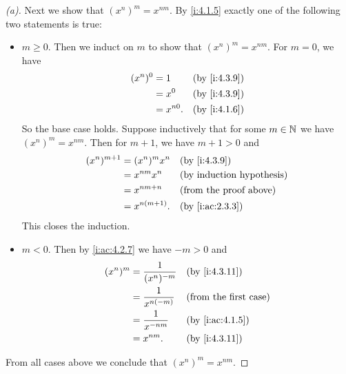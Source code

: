 \begin{proof}[(a)]
  Next we show that \((x^n)^m = x^{nm}\).
  By \cref{i:4.1.5} exactly one of the following two statements is true:
  \begin{itemize}
    \item \(m \geq 0\).
          Then we induct on \(m\) to show that \((x^n)^m = x^{nm}\).
          For \(m = 0\), we have
          \begin{align*}
            (x^n)^0 & = 1       &  & \by{i:4.3.9} \\
                    & = x^0     &  & \by{i:4.3.9} \\
                    & = x^{n0}. &  & \by{i:4.1.6}
          \end{align*}
          So the base case holds.
          Suppose inductively that for some \(m \in \mathbb{N}\) we have \((x^n)^m = x^{nm}\).
          Then for \(m + 1\), we have \(m + 1 > 0\) and
          \begin{align*}
            (x^n)^{m + 1} & = (x^n)^m x^n   &  & \by{i:4.3.9}                  \\
                          & = x^{nm} x^n    &  & \byIH                         \\
                          & = x^{nm + n}    &  & \text{(from the proof above)} \\
                          & = x^{n(m + 1)}. &  & \by{i:ac:2.3.3}
          \end{align*}
          This closes the induction.
    \item \(m < 0\).
          Then by \cref{i:ac:4.2.7} we have \(-m > 0\) and
          \begin{align*}
            (x^n)^m & = \dfrac{1}{(x^n)^{-m}} &  & \by{i:4.3.11}                \\
                    & = \dfrac{1}{x^{n(-m)}}  &  & \text{(from the first case)} \\
                    & = \dfrac{1}{x^{-nm}}    &  & \by{i:ac:4.1.5}              \\
                    & = x^{nm}.               &  & \by{i:4.3.11}
          \end{align*}
  \end{itemize}
  From all cases above we conclude that \((x^n)^m = x^{nm}\).


\end{proof}

